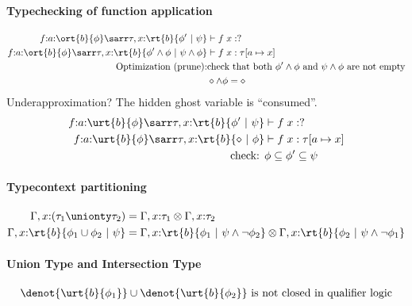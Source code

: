 \paragraph{Typechecking of function application}
\begin{align*}
    f{:}a{:}\ort{b}{\phi}\sarr\tau, x{:}\rt{b}{\phi' ~|~ \psi} &\vdash f\;x : ?
    \\f{:}a{:}\ort{b}{\phi}\sarr\tau, x{:}\rt{b}{\phi' \land \phi ~|~ \psi \land \phi} &\vdash f\;x : \tau[a\mapsto x]
    \\\text{Optimization (prune):}& \text{check that both $\phi' \land \phi$ and $\psi \land \phi$ are not empty}
    \\& \diamond \land \phi = \diamond
\end{align*}\noindent
Underapproximation? The hidden ghost variable is ``consumed''.
\begin{align*}
    f{:}a{:}\urt{b}{\phi}\sarr\tau, x{:}\rt{b}{\phi' ~|~ \psi} &\vdash f\;x : ?
    \\f{:}a{:}\urt{b}{\phi}\sarr\tau, x{:}\rt{b}{\diamond ~|~ \phi} &\vdash f\;x : \tau[a\mapsto x]
    \\\text{check: }& \phi \subseteq \phi' \subseteq \psi
\end{align*}\noindent

\paragraph{Typecontext partitioning}
\begin{align*}
\Gamma, x{:}(\tau_1 \unionty \tau_2) &= \Gamma, x{:}\tau_1 \otimes \Gamma, x{:}\tau_2 \\
\Gamma, x{:}\rt{b}{\phi_1 \cup \phi_2 ~|~ \psi} &= \Gamma, x{:}\rt{b}{\phi_1 ~|~ \psi \land \neg \phi_2} \otimes \Gamma, x{:}\rt{b}{\phi_2 ~|~ \psi \land \neg \phi_1}
\end{align*}\noindent


\paragraph{Union Type and Intersection Type}
\begin{align*}
    \denot{\urt{b}{\phi_1}} \cup \denot{\urt{b}{\phi_2}} \text{ is not closed in qualifier logic}
\end{align*}\noindent


